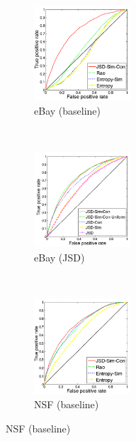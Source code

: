 \documentclass{article} %
\begin{document}
\begin{figure}
        \centering
        \begin{subfigure}[b]{0.24\textwidth}
                \centering
                \includegraphics[width=36mm]{../nips-ml-nlp/figures/phonecases-comparison-kopia.png}
               \caption{eBay (baseline)}
                \label{fig:phonecases-comparison}
        \end{subfigure}%
              ~ %
        \begin{subfigure}[b]{0.24\textwidth}
                \centering
                \includegraphics[width=36mm]{../nips-ml-nlp/figures/phonecases-breakdown-kopia.png}
                \caption{eBay (JSD)}
                \label{fig:phonecases-breakdown}
        \end{subfigure}\nobreak
              ~ %
        \begin{subfigure}[b]{0.24\textwidth}
                \centering
                \includegraphics[width=36mm]{../nips-ml-nlp/figures/nsf-comparison-kopia.png}
                \caption{NSF (baseline)}
                \label{fig:nsf-comparison}
        \end{subfigure}%

\end{figure}
\end{document}
